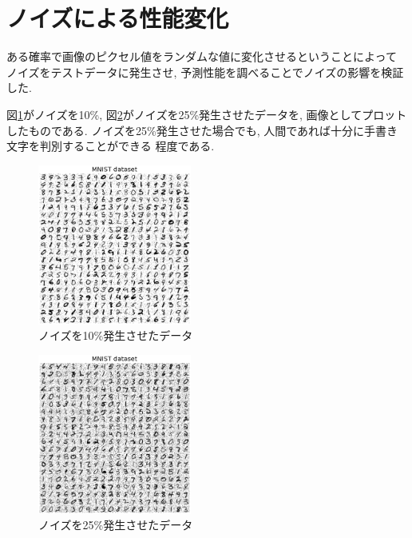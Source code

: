 \documentclass[10pt,a4paper,twocolumn]{jarticle}
\begin{document}

\section{ノイズによる性能変化}
ある確率で画像のピクセル値をランダムな値に変化させるということによって
ノイズをテストデータに発生させ, 予測性能を調べることでノイズの影響を検証した. 

図\ref{fig:noise-0.1}がノイズを10\%,
図\ref{fig:noise-0.25}がノイズを25\%発生させたデータを, 
画像としてプロットしたものである. 
ノイズを25\%発生させた場合でも, 人間であれば十分に手書き文字を判別することができる
程度である. 
\begin{figure}[htbp]
  \centering
  \includegraphics[width=0.45\textwidth]{assets/img/tiled_mnist_nl0.1.eps}
  \caption{ノイズを10\%発生させたデータ}
  \label{fig:noise-0.1}
\end{figure}
\begin{figure}[htbp]
  \centering
  \includegraphics[width=0.45\textwidth]{assets/img/tiled_mnist_nl0.25.eps}
  \caption{ノイズを25\%発生させたデータ}
  \label{fig:noise-0.25}
\end{figure}
\end{document}

